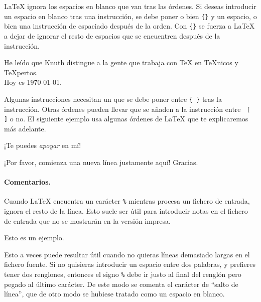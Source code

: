 \LaTeX{} ignora  los espacios en blanco  que van tras las  órdenes. Si
deseas introducir  un
espacio en blanco tras una instrucción, se debe poner o bien \verb|{}|
y un espacio, o bien una instrucción de espaciado después de la orden.
Con \verb|{}|  se fuerza  a \LaTeX{}  a dejar de  ignorar el  resto de
espacios que se encuentren después de la instrucción.

\begin{example}
He leído que Knuth distingue a la
gente que trabaja con \TeX{} en
\TeX{}nicos y \TeX pertos.\\
Hoy es \today.
\end{example}

Algunas instrucciones  necesitan un   que se  debe poner
entre  \verb|{ }| tras la instrucción. Otras órdenes pueden
llevar  que se añaden a la instrucción entre
~\verb|[  ]|  o no.  El  siguiente  ejemplo usa  algunas
órdenes de \LaTeX{} que te explicaremos más adelante.

\begin{example}
¡Te puedes \textsl{apoyar} en mí!
\end{example}
\begin{example}
¡Por favor, comienza una nueva
línea justamente aquí!%
\linebreak[3] Gracias.
\end{example}

\paragraph{Comentarios.}

Cuando  \LaTeX{} encuentra  un carácter  \verb|%| mientras  procesa un
fichero de entrada,  ignora el resto de la línea.  Esto suele ser útil
para introducir notas en el fichero  de entrada que no se mostrarán en
la versión impresa.

\begin{example}
Esto es un %
ejemplo.
\end{example}

Esto a  veces puede resultar  útil cuando no quieras  líneas demasiado
largas en  el fichero  fuente. Si no  quisieras introducir  un espacio
entre dos palabras, y prefieres tener dos renglones, entonces el signo
\verb|%| debe  ir justo  al final  del renglón  pero pegado  al último
carácter. De este  modo se comenta el carácter de  ``salto de línea'',
que de otro modo se hubiese tratado como un espacio en blanco.

